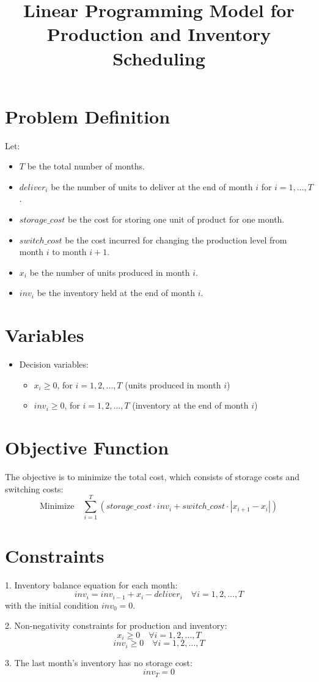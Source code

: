 \documentclass{article}
\begin{document}
\title{Linear Programming Model for Production and Inventory Scheduling}
\author{}
\date{}
\maketitle

\section*{Problem Definition}

Let:
\begin{itemize}
    \item $T$ be the total number of months.
    \item $deliver_i$ be the number of units to deliver at the end of month $i$ for $i=1, \ldots, T$.
    \item $storage\_cost$ be the cost for storing one unit of product for one month.
    \item $switch\_cost$ be the cost incurred for changing the production level from month $i$ to month $i+1$.
    \item $x_i$ be the number of units produced in month $i$.
    \item $inv_i$ be the inventory held at the end of month $i$.
\end{itemize}

\section*{Variables}
\begin{itemize}
    \item Decision variables:
    \begin{itemize}
        \item $x_i \geq 0$, for $i = 1, 2, \ldots, T$ (units produced in month $i$)
        \item $inv_i \geq 0$, for $i = 1, 2, \ldots, T$ (inventory at the end of month $i$)
    \end{itemize}
\end{itemize}

\section*{Objective Function}
The objective is to minimize the total cost, which consists of storage costs and switching costs:
\[
\text{Minimize} \quad \sum_{i=1}^T (storage\_cost \cdot inv_i + switch\_cost \cdot |x_{i+1} - x_i| )
\]

\section*{Constraints}
1. Inventory balance equation for each month:
\[
inv_i = inv_{i-1} + x_i - deliver_i \quad \forall i = 1, 2, \ldots, T
\]
with the initial condition \( inv_0 = 0 \).

2. Non-negativity constraints for production and inventory:
\[
x_i \geq 0 \quad \forall i = 1, 2, \ldots, T
\]
\[
inv_i \geq 0 \quad \forall i = 1, 2, \ldots, T
\]

3. The last month's inventory has no storage cost:
\[
inv_T = 0
\]
\end{document}
